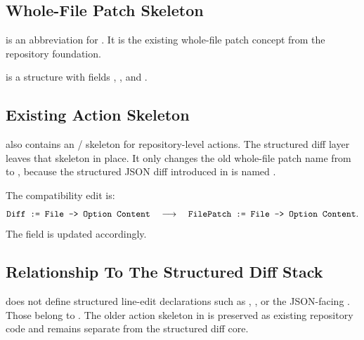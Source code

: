 \subsection{Whole-File Patch Skeleton}

\begin{definition}[FilePatch]
\code{[FilePatch]} is an abbreviation for . It is
the existing whole-file patch concept from the repository foundation.
\end{definition}

\begin{definition}[Commit]
\code{[Commit]} is a structure with fields ,
, and .
\end{definition}

\subsection{Existing Action Skeleton}

 also contains an / skeleton for
repository-level actions. The structured diff layer leaves that skeleton in
place. It only changes the old whole-file patch name from  to
, because the structured JSON diff introduced in
 is named .

\begin{definition}
The compatibility edit is:
\[
  \code{Diff := File -> Option Content}
  \quad\longrightarrow\quad
  \code{FilePatch := File -> Option Content}.
\]
The  field is updated accordingly.
\end{definition}

\subsection{Relationship To The Structured Diff Stack}

\begin{definition}
 does not define structured line-edit declarations such as
, , or the JSON-facing . Those belong to
. The older action skeleton in  is preserved
as existing repository code and remains separate from the structured diff core.
\end{definition}
